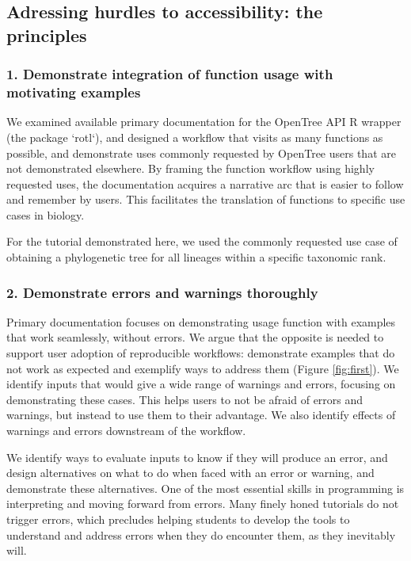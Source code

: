 \documentclass[12pt]{article}
\begin{document}
\subsection*{Adressing hurdles to accessibility: the principles}

\subsubsection*{1. Demonstrate integration of function usage with motivating examples}

We examined available primary documentation for the OpenTree API R wrapper (the package `rotl`),
and designed a workflow that visits as many functions as possible, and demonstrate
uses commonly requested by OpenTree users that are not demonstrated elsewhere.
By framing the function workflow using highly requested uses, the documentation acquires a
narrative arc that is easier to follow and remember by users. This facilitates the translation
of functions to specific use cases in biology.

For the tutorial demonstrated here, we used the commonly requested use case of obtaining
a phylogenetic tree for all lineages within a specific taxonomic rank.

\subsubsection*{2. Demonstrate errors and warnings thoroughly}

Primary documentation focuses on demonstrating usage function with examples that
work seamlessly, without errors. We argue that the opposite is needed to support
user adoption of reproducible workflows: demonstrate examples that do not work
as expected and exemplify ways to address them (Figure \ref{fig:first}).
We identify inputs that would give
a wide range of warnings and errors, focusing on demonstrating these cases. This
helps users to not be afraid of errors and warnings, but instead to use them to
their advantage.
We also identify effects of warnings and errors downstream of the workflow.

We identify ways to evaluate inputs to know if they will produce an error, and design
alternatives on what to do when faced with an error or warning, and demonstrate
these alternatives.
One of the most essential skills in programming is interpreting and moving forward
from errors.
Many finely honed tutorials do not trigger errors, which precludes helping students
to develop the tools to understand and address errors when they do encounter them,
as they inevitably will.
\end{document}
